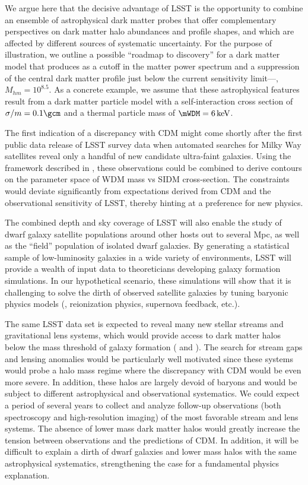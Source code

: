 We argue here that the decisive advantage of LSST is the opportunity to combine an ensemble of astrophysical dark matter probes that offer complementary perspectives on dark matter halo abundances and profile shapes, and which are affected by different sources of systematic uncertainty.
For the purpose of illustration, we outline a possible ``roadmap to discovery'' for a dark matter model that produces as a cutoff in the matter power spectrum and a suppression of the central dark matter profile just below the current sensitivity limit---\ie, $M_{hm} = 10^{8.5}$.
As a concrete example, we assume that these astrophysical features result from a dark matter particle model with a self-interaction cross section of $\sigma/m = 0.1 \gcm$ and a thermal particle mass of $\mWDM = 6 \keV$.

The first indication of a discrepancy with CDM might come shortly after the first public data release of LSST survey data when automated searches for Milky Way satellites reveal only a handful of new candidate ultra-faint galaxies. 
Using the framework described in , these observations could be combined to derive contours on the parameter space of WDM mass vs SIDM cross-section.
The constraints would deviate significantly from expectations derived from CDM and the observational sensitivity of LSST, thereby hinting at a preference for new physics.

The combined depth and sky coverage of LSST will also enable the study of dwarf galaxy satellite populations around other hosts out to several Mpc, as well as the ``field'' population of isolated dwarf galaxies.
By generating a statistical sample of low-luminosity galaxies in a wide variety of environments, LSST will provide a wealth of input data to theoreticians developing galaxy formation simulations.
In our hypothetical scenario, these simulations will show that it is challenging to solve the dirth of observed satellite galaxies by tuning baryonic physics models (\eg, reionization physics, supernova feedback, etc.).

The same LSST data set is expected to reveal many new stellar streams and gravitational lens systems, which would provide access to dark matter halos below the mass threshold of galaxy formation ( and ).
The search for stream gaps and lensing anomalies would be particularly well motivated since these systems would probe a halo mass regime where the discrepancy with CDM would be even more severe.
In addition, these halos are largely devoid of baryons and would be subject to different astrophysical and observational systematics.
We could expect a period of several years to collect and analyze follow-up observations (both spectroscopy and high-resolution imaging) of the most favorable stream and lens systems.
The absence of lower mass dark matter halos would greatly increase the tension between observations and the predictions of CDM.
In addition, it will be difficult to explain a dirth of dwarf galaxies and lower mass halos with the same astrophysical systematics, strengthening the case for a fundamental physics explanation.

